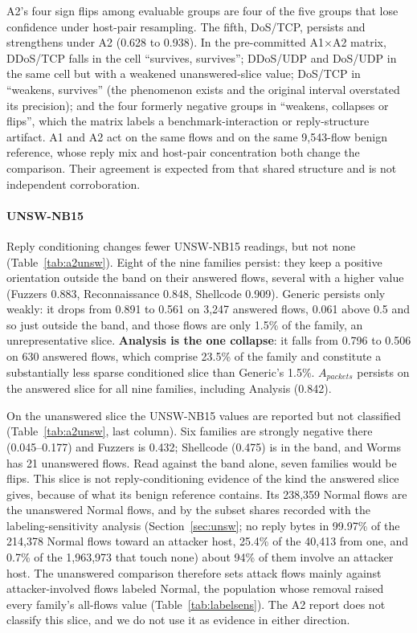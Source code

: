 \documentclass[preprint,12pt]{elsarticle}
\begin{document}
A2's four sign flips among evaluable groups are four of the five groups that lose confidence under host-pair resampling. The fifth, DoS/TCP, persists and strengthens under A2 (0.628 to 0.938). In the pre-committed A1$\times$A2 matrix, DDoS/TCP falls in the cell ``survives, survives''; DDoS/UDP and DoS/UDP in the same cell but with a weakened unanswered-slice value; DoS/TCP in ``weakens, survives'' (the phenomenon exists and the original interval overstated its precision); and the four formerly negative groups in ``weakens, collapses or flips'', which the matrix labels a benchmark-interaction or reply-structure artifact. A1 and A2 act on the same flows and on the same 9{,}543-flow benign reference, whose reply mix and host-pair concentration both change the comparison. Their agreement is expected from that shared structure and is not independent corroboration.

\paragraph{UNSW-NB15} Reply conditioning changes fewer UNSW-NB15 readings, but not none (Table~\ref{tab:a2unsw}). Eight of the nine families persist: they keep a positive orientation outside the band on their answered flows, several with a higher value (Fuzzers 0.883, Reconnaissance 0.848, Shellcode 0.909). Generic persists only weakly: it drops from 0.891 to 0.561 on 3{,}247 answered flows, 0.061 above 0.5 and so just outside the band, and those flows are only 1.5\% of the family, an unrepresentative slice. \textbf{Analysis is the one collapse}: it falls from 0.796 to 0.506 on 630 answered flows, which comprise 23.5\% of the family and constitute a substantially less sparse conditioned slice than Generic's 1.5\%. $A_{packets}$ persists on the answered slice for all nine families, including Analysis (0.842).

On the unanswered slice the UNSW-NB15 values are reported but not classified (Table~\ref{tab:a2unsw}, last column). Six families are strongly negative there (0.045--0.177) and Fuzzers is 0.432; Shellcode (0.475) is in the band, and Worms has 21 unanswered flows. Read against the band alone, seven families would be flips. This slice is not reply-conditioning evidence of the kind the answered slice gives, because of what its benign reference contains. Its 238{,}359 Normal flows are the unanswered Normal flows, and by the subset shares recorded with the labeling-sensitivity analysis (Section~\ref{sec:unsw}; no reply bytes in 99.97\% of the 214{,}378 Normal flows toward an attacker host, 25.4\% of the 40{,}413 from one, and 0.7\% of the 1{,}963{,}973 that touch none) about 94\% of them involve an attacker host. The unanswered comparison therefore sets attack flows mainly against attacker-involved flows labeled Normal, the population whose removal raised every family's all-flows value (Table~\ref{tab:labelsens}). The A2 report does not classify this slice, and we do not use it as evidence in either direction.
\end{document}
